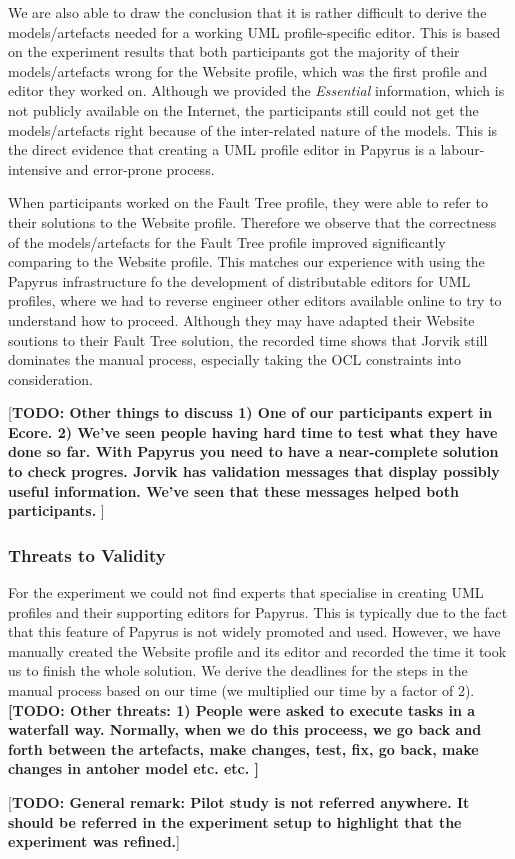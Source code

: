 We are also able to draw the conclusion that it is rather difficult to derive the models/artefacts needed for a working UML profile-specific editor. 
This is based on the experiment results that both participants got the majority of their models/artefacts wrong for the Website profile, which was the first profile and editor they worked on.
Although we provided the \textit{Essential} information, which is not publicly available on the Internet, the participants still could not get the models/artefacts right because of the inter-related nature of the models.
This is the direct evidence that creating a UML profile editor in Papyrus is a labour-intensive and error-prone process.

When participants worked on the Fault Tree profile, they were able to refer to their solutions to the Website profile. 
Therefore we observe that the correctness of the models/artefacts for the Fault Tree profile improved significantly comparing to the Website profile. This matches our experience with using the Papyrus infrastructure fo the development of distributable editors for UML profiles, where we had to reverse engineer other editors available online to try to understand how to proceed.
Although they may have adapted their Website soutions to their Fault Tree solution, the recorded time shows that Jorvik still dominates the manual process, especially taking the OCL constraints into consideration.

[\textbf{TODO: Other things to discuss 1) One of our participants expert in Ecore. 2) We've seen people having hard time to test what they have done so far. With Papyrus you need to have a near-complete solution to check progres. Jorvik has validation messages that display possibly useful information. We've seen that these messages helped both participants. }]

\subsubsection{Threats to Validity}
For the experiment we could not find experts that specialise in creating UML profiles and their supporting editors for Papyrus. 
This is typically due to the fact that this feature of Papyrus is not widely promoted and used.
However, we have manually created the Website profile and its editor and recorded the time it took us to finish the whole solution. 
We derive the deadlines for the steps in the manual process based on our time (we multiplied our time by a factor of 2). 
\textbf{[TODO: Other threats: 1) People were asked to execute tasks in a waterfall way. Normally, when we do this proceess, we go back and forth between the artefacts, make changes, test, fix, go back, make changes in antoher model etc. etc. ]}



[\textbf{TODO: General remark: Pilot study is not referred anywhere. It should be referred in the experiment setup to highlight that the experiment was refined.}]
